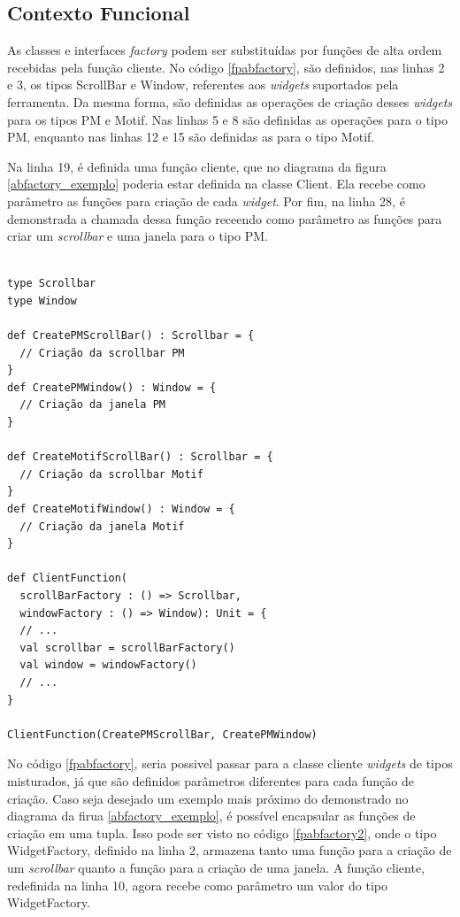 \subsection*{Contexto Funcional}

As classes e interfaces \textit{factory} podem 
ser substituídas por funções de alta ordem 
recebidas pela função cliente. 
No código \ref{fpabfactory}, são definidos, 
nas linhas 2 e 3,  
os tipos ScrollBar e Window, referentes aos 
\textit{widgets} suportados pela ferramenta. 
Da mesma forma, são definidas as operações de 
criação desses \textit{widgets} para os tipos 
PM e Motif. Nas linhas 5 e 8 são definidas as 
operações para o tipo PM, enquanto nas linhas 
12 e 15 são definidas as para o tipo Motif. 

Na linha 19, é definida uma função cliente, 
que no diagrama da figura \ref{abfactory_exemplo} 
poderia estar definida na classe Client. Ela 
recebe como parâmetro as funções para criação de 
cada \textit{widget}. Por fim, na linha 28, é 
demonstrada a chamada dessa função receendo 
como parâmetro as funções para criar um 
\textit{scrollbar} e uma janela para o tipo 
PM.

\begin{lstlisting}[caption={Abstract Factory Funcional},label=fpabfactory]
    
type Scrollbar
type Window

def CreatePMScrollBar() : Scrollbar = {
  // Criação da scrollbar PM
}
def CreatePMWindow() : Window = {
  // Criação da janela PM
}

def CreateMotifScrollBar() : Scrollbar = {
  // Criação da scrollbar Motif
}
def CreateMotifWindow() : Window = {
  // Criação da janela Motif
}

def ClientFunction(
  scrollBarFactory : () => Scrollbar, 
  windowFactory : () => Window): Unit = {
  // ...
  val scrollbar = scrollBarFactory()
  val window = windowFactory()
  // ...
}

ClientFunction(CreatePMScrollBar, CreatePMWindow)

\end{lstlisting}

No código \ref{fpabfactory}, seria possivel passar 
para a classe cliente \textit{widgets} de tipos 
misturados, já que são definidos parâmetros 
diferentes para cada função de criação. Caso 
seja desejado um exemplo mais próximo do demonstrado 
no diagrama da firua \ref{abfactory_exemplo}, 
é possível encapsular as funções de criação 
em uma tupla. Isso pode ser visto no código 
\ref{fpabfactory2}, onde o tipo WidgetFactory, 
definido na linha 2, armazena tanto uma função 
para a criação de um \textit{scrollbar} quanto a função 
para a criação de uma janela. A função 
cliente, redefinida na linha 10, agora 
recebe como parâmetro um valor do tipo 
WidgetFactory.


